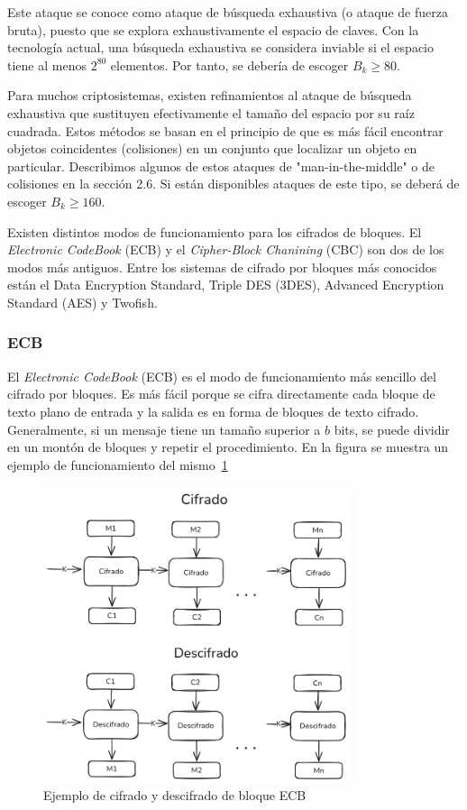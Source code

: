 Este ataque se conoce como ataque de búsqueda exhaustiva (o ataque de fuerza bruta), puesto que se explora exhaustivamente el espacio de claves. Con la tecnología actual, una búsqueda exhaustiva se considera inviable si el espacio tiene al menos \(2^{80}\) elementos. Por tanto, se debería de  escoger \(B_k \ge 80\).

Para muchos criptosistemas, existen refinamientos al ataque de búsqueda exhaustiva que sustituyen efectivamente el tamaño del espacio por su raíz cuadrada. Estos métodos se basan en el principio de que es más fácil encontrar objetos coincidentes (colisiones) en un conjunto que localizar un objeto en particular. Describimos algunos de estos ataques de "man-in-the-middle" o de colisiones en la sección 2.6. Si están disponibles ataques de este tipo, se deberá de escoger \(B_k \ge 160\).


Existen distintos modos de funcionamiento para los cifrados de bloques. El \emph{Electronic CodeBook} (ECB) y el \emph{Cipher-Block Chanining} (CBC) son dos de los modos más antiguos. Entre los sistemas de cifrado por bloques más conocidos están el Data Encryption Standard, Triple DES (3DES)\citep{tdes-techtarget}, Advanced Encryption Standard (AES)\citep{aes-nist} y Twofish\citep{Block_Cipher}\citep{twofish-schneier}.


\subsubsection{ECB}
El \emph{Electronic CodeBook} (ECB) es el modo de funcionamiento más sencillo del cifrado por bloques. Es más fácil porque se cifra directamente cada bloque de texto plano de entrada y la salida es en forma de bloques de texto cifrado. Generalmente, si un mensaje tiene un tamaño superior a $b$ bits, se puede dividir en un montón de bloques y repetir el procedimiento. En la figura se muestra un ejemplo de funcionamiento del mismo~\ref{fig:ECB_block_cypher}
\begin{figure}[H]
    \centering
    \includegraphics[width=0.8\textwidth]{imagenes/ECB_block_cypher.png}
    \caption{Ejemplo de cifrado y descifrado de bloque ECB}
    \label{fig:ECB_block_cypher}
\end{figure}

